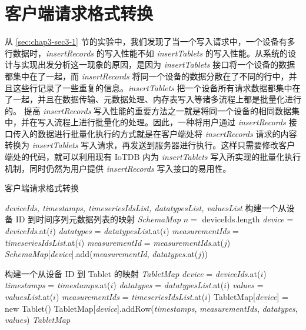 \section{客户端请求格式转换}
从 \ref{sec:chap3-sec3-1} 节的实验中，我们发现了当一个写入请求中，一个设备有多行数据时，\emph{insertRecords} 的写入性能不如 \emph{insertTablets} 的写入性能。从系统的设计与实现出发分析这一现象的原因，是因为 \emph{insertTablets} 接口将一个设备的数据都集中在了一起，而 \emph{insertRecords} 将同一个设备的数据分散在了不同的行中，并且这些行记录了一些重复的信息。\emph{insertTablets} 把一个设备所有请求数据都集中在了一起，并且在数据传输、元数据处理、内存表写入等诸多流程上都是批量化进行的。
提高 \emph{insertRecords} 写入性能的重要方法之一就是将同一个设备的相同数据集中，并在写入流程上进行批量化的处理。因此，一种将用户通过 \emph{insertRecords} 接口传入的数据进行批量化执行的方式就是在客户端处将 \emph{insertRecords} 请求的内容转换为 \emph{insertTablets} 写入请求，再发送到服务器进行执行。这样只需要修改客户端处的代码，就可以利用现有 IoTDB 内为 \emph{insertTablets} 写入所实现的批量化执行机制，同时仍然为用户提供 \emph{insertRecords} 写入接口的易用性。

\begin{algorithm}
  \caption{客户端请求格式转换}
  \label{alg:client-req-convert}
  \small
  \begin{algorithmic}
    \REQUIRE \emph{deviceIds, timestamps, timeseriesIdsList, datatypesList, valuesList}
    \STATE 构建一个从设备 ID 到时间序列元数据列表的映射 \emph{SchemaMap}
    \STATE $n = $ deviceIds.length
      \STATE \emph{device} =  \emph{deviceIds}.at($i$)
      \STATE \emph{datatypes} = \emph{datatypesList}.at($i$)
      \STATE \emph{measurementIds} = \emph{timeseriesIdsList}.at($i$)
        \STATE \emph{measurementId} = \emph{measurementIds}.at($j$)
          \STATE \emph{SchemaMap}[\emph{device}].add(\emph{measurementId}, \emph{datatypes}.at($j$))
        \ENDIF
      \ENDFOR
    \ENDFOR

    \STATE 构建一个从设备 ID 到 Tablet 的映射 \emph{TabletMap}
      \STATE \emph{device} =  \emph{deviceIds}.at($i$)
      \STATE \emph{timestamps} = \emph{timestamps}.at($i$)
      \STATE \emph{datatypes} = \emph{datatypesList}.at($i$)
      \STATE \emph{values} = \emph{valuesList}.at($i$)
      \STATE \emph{measurementIds} = \emph{timeseriesIdsList}.at($i$)
        \STATE TabletMap[\emph{device}] = new Tablet()
      \ENDIF 
      \STATE TabletMap[\emph{device}].addRow(\emph{timestamps}, \emph{measurementIds}, \emph{datatypes}, \emph{values})
    \ENDFOR
    \RETURN \emph{TabletMap}
  \end{algorithmic}
\end{algorithm}

